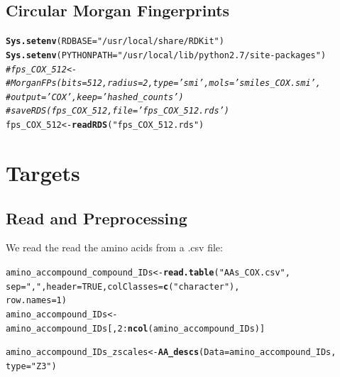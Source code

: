 \documentclass[twoside,a4wide,12pt]{article}\usepackage[]{graphicx}\usepackage[]{color}
\makeatletter
\newcommand{\hlnum}[1]{\textcolor[rgb]{0.686,0.059,0.569}{#1}}%
\newcommand{\hlstr}[1]{\textcolor[rgb]{0.192,0.494,0.8}{#1}}%
\newcommand{\hlcom}[1]{\textcolor[rgb]{0.678,0.584,0.686}{\textit{#1}}}%
\newcommand{\hlopt}[1]{\textcolor[rgb]{0,0,0}{#1}}%
\newcommand{\hlstd}[1]{\textcolor[rgb]{0.345,0.345,0.345}{#1}}%
\newcommand{\hlkwb}[1]{\textcolor[rgb]{0.69,0.353,0.396}{#1}}%
\newcommand{\hlkwc}[1]{\textcolor[rgb]{0.333,0.667,0.333}{#1}}%
\newcommand{\hlkwd}[1]{\textcolor[rgb]{0.737,0.353,0.396}{\textbf{#1}}}%
\newenvironment{kframe}{%
 \def\at@end@of@kframe{}%
 \ifinner\ifhmode%
  \def\at@end@of@kframe{\end{minipage}}%
  \begin{minipage}{\columnwidth}%
 \fi\fi%
 \def\FrameCommand##1{\hskip\@totalleftmargin \hskip-\fboxsep
 \colorbox{shadecolor}{##1}\hskip-\fboxsep
     \hskip-\linewidth \hskip-\@totalleftmargin \hskip\columnwidth}%
 \MakeFramed {\advance\hsize-\width
   \@totalleftmargin\z@ \linewidth\hsize
   \@setminipage}}%
 {\par\unskip\endMakeFramed%
 \at@end@of@kframe}
\newenvironment{knitrout}{}{} %
\makeatother
\begin{document}
\subsection{Circular Morgan Fingerprints}
\begin{knitrout}
\color{fgcolor}\begin{kframe}
\begin{alltt}
\hlkwd{Sys.setenv}\hlstd{(}\hlkwc{RDBASE} \hlstd{=} \hlstr{"/usr/local/share/RDKit"}\hlstd{)}
\hlkwd{Sys.setenv}\hlstd{(}\hlkwc{PYTHONPATH} \hlstd{=} \hlstr{"/usr/local/lib/python2.7/site-packages"}\hlstd{)}
\hlcom{# fps_COX_512 <-}
\hlcom{# MorganFPs(bits=512,radius=2,type='smi',mols='smiles_COX.smi',}
\hlcom{# output='COX',keep='hashed_counts')}
\hlcom{# saveRDS(fps_COX_512,file='fps_COX_512.rds')}
\hlstd{fps_COX_512} \hlkwb{<-} \hlkwd{readRDS}\hlstd{(}\hlstr{"fps_COX_512.rds"}\hlstd{)}
\end{alltt}
\end{kframe}
\end{knitrout}


\section{Targets}

\subsection{Read and Preprocessing}
We read the read the amino acids from a .csv file:
\begin{knitrout}
\color{fgcolor}\begin{kframe}
\begin{alltt}
\hlstd{amino_accompound_compound_IDs} \hlkwb{<-} \hlkwd{read.table}\hlstd{(}\hlstr{"AAs_COX.csv"}\hlstd{,}
    \hlkwc{sep} \hlstd{=} \hlstr{","}\hlstd{,} \hlkwc{header} \hlstd{=} \hlnum{TRUE}\hlstd{,} \hlkwc{colClasses} \hlstd{=} \hlkwd{c}\hlstd{(}\hlstr{"character"}\hlstd{),}
    \hlkwc{row.names} \hlstd{=} \hlnum{1}\hlstd{)}
\hlstd{amino_accompound_IDs} \hlkwb{<-} \hlstd{amino_accompound_IDs[,} \hlnum{2}\hlopt{:}\hlkwd{ncol}\hlstd{(amino_accompound_IDs)]}
\end{alltt}
\end{kframe}
\end{knitrout}


\begin{knitrout}
\color{fgcolor}\begin{kframe}
\begin{alltt}
\hlstd{amino_accompound_IDs_zscales} \hlkwb{<-} \hlkwd{AA_descs}\hlstd{(}\hlkwc{Data} \hlstd{= amino_accompound_IDs,}
    \hlkwc{type} \hlstd{=} \hlstr{"Z3"}\hlstd{)}
\end{alltt}
\end{kframe}
\end{knitrout}
\end{document}
